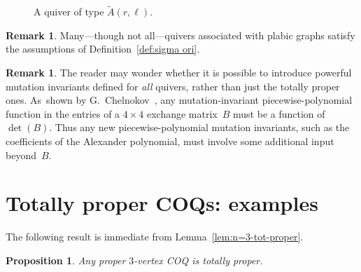 \documentclass[11pt, letterpaper]{amsart}
\newcommand{\cS}[1]{{\noindent\textsf{\color{purple}$\blacksquare$~#1~$\blacksquare$}}}
\newtheorem{proposition}[theorem]{Proposition}
\theoremstyle{definition}
\newtheorem{remark}[theorem]{Remark}
\numberwithin{equation}{section}
\begin{document}
{\begin{figure}[ht]
\begin{center}
{\begin{tikzpicture}
\end{tikzpicture}
}
\end{center}
\caption{A quiver of type $\tilde A(r, \ell)$.}
\label{fig:affine A blowup}
\end{figure}
} %


\begin{remark}
\label{rem:plabics}
Many---though not all---quivers associated with plabic graphs satisfy the assumptions of Definition~\ref{def:sigma ori}.
\end{remark}

\enlargethispage{5pt}

\begin{remark}
The reader may wonder whether it is possible to introduce powerful mutation invariants defined for \emph{all} quivers,
rather than just the totally proper ones. 
As~shown by G.~Chelnokov~\cite{ChelnokovNoInvs}, 
any mutation-invariant
piecewise-polynomial function in the entries of a $4\times 4$ exchange matrix~$B$ 
must be a function of~$\det(B)$. 
Thus any new piecewise-polynomial mutation invariants, such as the coefficients of the Alexander polynomial, 
must involve some additional input beyond~$B$. %
\end{remark}

\newpage

\section{Totally proper COQs: examples}
\label{sec:totally proper examples}

The following result is immediate from Lemma~\ref{lem:n=3-tot-proper}.

\begin{proposition}
\label{prop:3-vert proper}
Any proper $3$-vertex COQ is totally proper.
\end{proposition}
\end{document}
